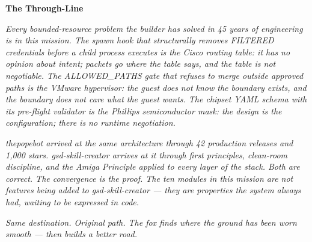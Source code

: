 \documentclass[11pt,letterpaper]{article}
\begin{document}
\begin{quotebox}
\textbf{\sffamily\textcolor{primary}{The Through-Line}}

\textit{Every bounded-resource problem the builder has solved in 45 years of engineering is in this mission. The spawn hook that structurally removes FILTERED credentials before a child process executes is the Cisco routing table: it has no opinion about intent; packets go where the table says, and the table is not negotiable. The ALLOWED\_PATHS gate that refuses to merge outside approved paths is the VMware hypervisor: the guest does not know the boundary exists, and the boundary does not care what the guest wants. The chipset YAML schema with its pre-flight validator is the Phillips semiconductor mask: the design is the configuration; there is no runtime negotiation.}

\textit{thepopebot arrived at the same architecture through 42 production releases and 1,000 stars. gsd-skill-creator arrives at it through first principles, clean-room discipline, and the Amiga Principle applied to every layer of the stack. Both are correct. The convergence is the proof. The ten modules in this mission are not features being added to gsd-skill-creator --- they are properties the system always had, waiting to be expressed in code.}

\textit{Same destination. Original path. The fox finds where the ground has been worn smooth --- then builds a better road.}
\end{quotebox}
\end{document}
